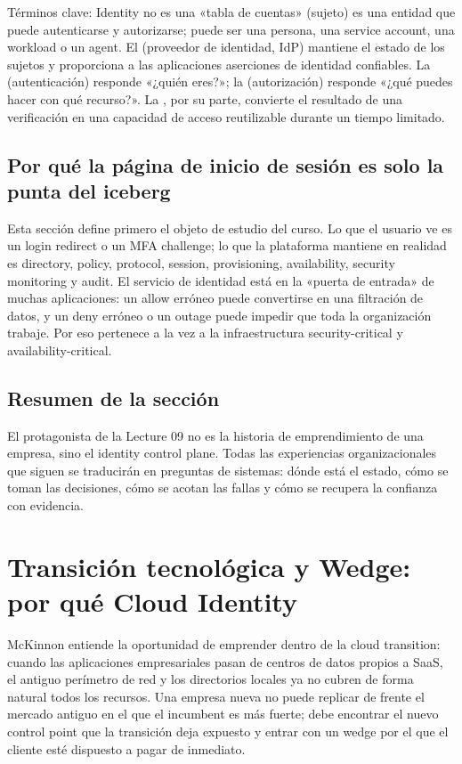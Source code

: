 \documentclass[a4paper]{article}
\begin{document}
\begin{knowledgebox}{Términos clave: Identity no es una «tabla de cuentas»}
 (sujeto) es una entidad que puede autenticarse y autorizarse; puede ser una persona, una service account, una workload o un agent. El  (proveedor de identidad, IdP) mantiene el estado de los sujetos y proporciona a las aplicaciones aserciones de identidad confiables. La  (autenticación) responde «¿quién eres?»; la  (autorización) responde «¿qué puedes hacer con qué recurso?». La , por su parte, convierte el resultado de una verificación en una capacidad de acceso reutilizable durante un tiempo limitado.
\end{knowledgebox}

\subsection{Por qué la página de inicio de sesión es solo la punta del iceberg}

Esta sección define primero el objeto de estudio del curso. Lo que el usuario ve es un login redirect o un MFA challenge; lo que la plataforma mantiene en realidad es directory, policy, protocol, session, provisioning, availability, security monitoring y audit. El servicio de identidad está en la «puerta de entrada» de muchas aplicaciones: un allow erróneo puede convertirse en una filtración de datos, y un deny erróneo o un outage puede impedir que toda la organización trabaje. Por eso pertenece a la vez a la infraestructura security-critical y availability-critical.

\subsection{Resumen de la sección}

El protagonista de la Lecture 09 no es la historia de emprendimiento de una empresa, sino el identity control plane. Todas las experiencias organizacionales que siguen se traducirán en preguntas de sistemas: dónde está el estado, cómo se toman las decisiones, cómo se acotan las fallas y cómo se recupera la confianza con evidencia.
\section{Transición tecnológica y Wedge: por qué Cloud Identity}

McKinnon entiende la oportunidad de emprender dentro de la cloud transition: cuando las aplicaciones empresariales pasan de centros de datos propios a SaaS, el antiguo perímetro de red y los directorios locales ya no cubren de forma natural todos los recursos. Una empresa nueva no puede replicar de frente el mercado antiguo en el que el incumbent es más fuerte; debe encontrar el nuevo control point que la transición deja expuesto y entrar con un wedge por el que el cliente esté dispuesto a pagar de inmediato.
\end{document}
